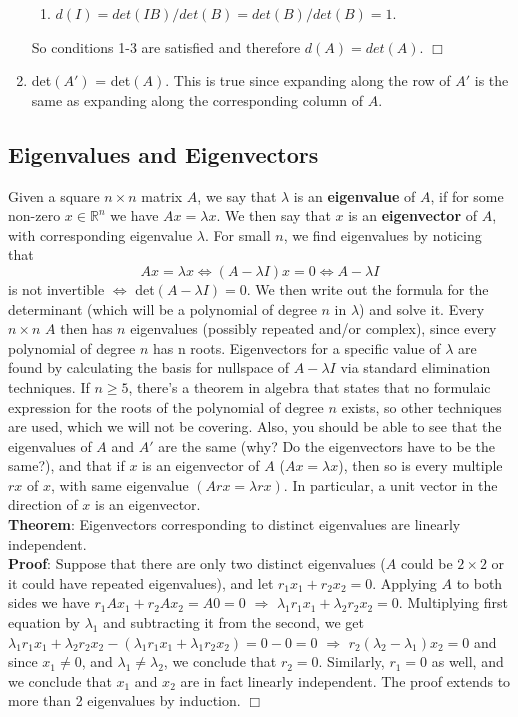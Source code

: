 \documentclass[12pt,oneside]{article}
\begin{document}
\begin{enumerate}
\begin{enumerate}[(1)]
   \item $d(I) = det(IB)/det(B) = det(B)/det(B) = 1$.
\end{enumerate}
So conditions 1-3 are satisfied and therefore $d(A) = det(A)$. $\Box$



\item det$(A')$ = det$(A)$. This is true since expanding along the row
  of $A'$ is the same as expanding along the corresponding column of $A$.
\end{enumerate}
\subsection{Eigenvalues and Eigenvectors}
Given a square $n \times n$ matrix $A$, we say that $\lambda$ is an
\textbf{eigenvalue} of $A$, if for some non-zero $x \in {\mathbb{R}}^n$
we have $Ax = \lambda x$. We then say that $x$ is an
\textbf{eigenvector} of $A$, with corresponding eigenvalue
$\lambda$. For small $n$, we find eigenvalues by noticing that $$Ax =
\lambda x \Longleftrightarrow (A - \lambda I)x = 0
\Longleftrightarrow A - \lambda I$$ is not invertible
$\Longleftrightarrow$ det$(A - \lambda I) = 0$. We then write out the
formula for the determinant (which will be a polynomial of degree $n$
in $\lambda$) and solve it. Every $n \times n$ $A$ then has $n$
eigenvalues (possibly repeated and/or complex), since every polynomial
of degree $n$ has n roots. Eigenvectors for a specific value of
$\lambda$ are found by calculating the basis for nullspace of $A -
\lambda I$ via standard elimination techniques. If $n \geq 5$, there's
a theorem in algebra that states that no formulaic expression for the
roots of the polynomial of degree $n$ exists, so other techniques are
used, which we will not be covering. Also, you should be able to see
that the eigenvalues of $A$ and $A'$ are the same (why? Do the
eigenvectors have to be the same?), and that if $x$ is an eigenvector
of $A$ ($Ax = \lambda x$), then so is every multiple $r x$ of $x$,
with same eigenvalue $(Arx = \lambda r x)$. In particular, a unit
vector in the direction of $x$ is an eigenvector.\\

\textbf{Theorem}: Eigenvectors corresponding to distinct eigenvalues
are linearly independent.\\

\textbf{Proof}: Suppose that there are only two distinct
eigenvalues ($A$ could be $2 \times 2$ or it could have repeated
eigenvalues), and let $r_1 x_1 + r_2 x_2 = 0$. Applying $A$ to both
sides we have $r_1 Ax_1 + r_2 Ax_2 = A 0 = 0$ $\Longrightarrow$
$\lambda_1 r_1 x_1 + \lambda_2 r_2 x_2 = 0$. Multiplying first
equation by $\lambda_1$ and subtracting it from the second, we get
$\lambda_1 r_1 x_1 + \lambda_2 r_2 x_2 - (\lambda_1 r_1 x_1 + \lambda_1
r_2 x_2) = 0 - 0 = 0$ $\Longrightarrow$ $r_2 (\lambda_2 - \lambda_1)
x_2 = 0$ and since $x_1 \neq 0$, and $\lambda_1 \neq \lambda_2$, we
conclude that $r_2 = 0$. Similarly, $r_1 = 0$ as well, and we conclude
that $x_1$ and $x_2$ are in fact linearly independent. The proof
extends to more than 2 eigenvalues by induction. $\Box$
\\
\end{document}
